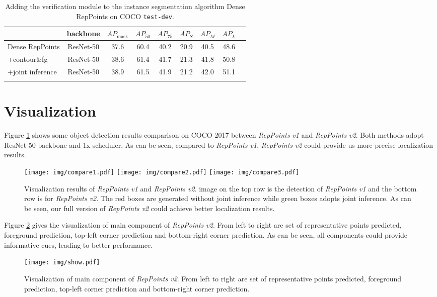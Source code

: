 \documentclass{article}
\begin{document}
\begin{table}
  \vspace{-0.5em}
  \caption{Adding the verification module to the instance segmentation algorithm Dense RepPoints on COCO \texttt{test-dev}.}
  \small
  \label{tab:inssegapp}
  \centering
  \begin{tabular}{lcccccccc}
    \Xhline{1.0pt}
     & backbone & $AP_\text{mask}$ & $AP_{50}$ & $AP_{75}$ & $AP_{S}$ & $AP_{M}$ & $AP_{L}$\\
    \hline
    Dense RepPoints & ResNet-50 & 37.6 & 60.4 & 40.2 & 20.9 & 40.5 & 48.6\\
    +contour\&fg & ResNet-50 & 38.6 & 61.4 & 41.7 & 21.3 & 41.8 & 50.8\\
    +joint inference & ResNet-50 & 38.9 & 61.5 & 41.9 & 21.2 & 42.0 & 51.1\\
    \Xhline{1.0pt}
  \end{tabular}
\end{table}

\section{Visualization} \label{sec:visualization}

Figure \ref{fig:vis} shows some object detection results comparison on COCO 2017 \cite{MSCOCO} between \textit{RepPoints v1} \cite{yang19reppts} and \textit{RepPoints v2}. Both methods adopt ResNet-50 backbone and 1x scheduler. As can be seen, compared to \textit{RepPoints v1}, \textit{RepPoints v2} could provide us more precise localization results.

\begin{figure}
    \centering
    \texttt{[image: img/compare1.pdf]}
    \texttt{[image: img/compare2.pdf]}
    \texttt{[image: img/compare3.pdf]}
    \caption{Visualization results of \textit{RepPoints v1} and \textit{RepPoints v2}. image on the top row is the detection of \textit{RepPoints v1} and the bottom row is for \textit{RepPoints v2}. The red boxes are generated without joint inference while green boxes adopts joint inference. As can be seen, our full version of \textit{RepPoints v2} could achieve better localization results.}
    \label{fig:vis}
\end{figure}

Figure \ref{fig:detail} gives the visualization of main component of \textit{RepPoints v2}. From left to right are set of representative points predicted, foreground prediction, top-left corner prediction and bottom-right corner prediction. As can be seen, all components could provide informative cues, leading to better performance.

\begin{figure}
    \centering
    \texttt{[image: img/show.pdf]}
    \caption{Visualization of main component of \textit{RepPoints v2}. From left to right are set of representative points predicted, foreground prediction, top-left corner prediction and bottom-right corner prediction.}
    \label{fig:detail}
\end{figure}
\end{document}
